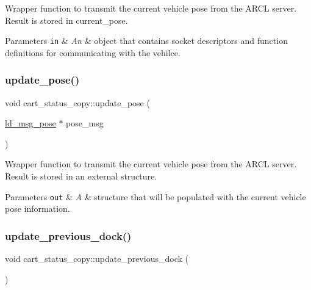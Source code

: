 Wrapper function to transmit the current vehicle pose from the A\+R\+CL server. Result is stored in current\+\_\+pose. 
\begin{DoxyParams}[1]{Parameters}
\mbox{\tt in}  & {\em An} & object that contains socket descriptors and function definitions for communicating with the vehilce. \\
\hline
\end{DoxyParams}
\mbox{\label{classcart__status__copy_ac688410b9b4a237d6ce6379e10f3c8bb}} 
\subsubsection{\texorpdfstring{update\+\_\+pose()}{update\_pose()}\hspace{0.1cm}{\footnotesize\ttfamily [2/2]}}
{\footnotesize\ttfamily void cart\+\_\+status\+\_\+copy\+::update\+\_\+pose (\begin{DoxyParamCaption}\item[{\hyperlink{structld__msg__pose}{ld\+\_\+msg\+\_\+pose} $\ast$}]{pose\+\_\+msg }\end{DoxyParamCaption})}

Wrapper function to transmit the current vehicle pose from the A\+R\+CL server. Result is stored in an external structure. 
\begin{DoxyParams}[1]{Parameters}
\mbox{\tt out}  & {\em A} & structure that will be populated with the current vehicle pose information. \\
\hline
\end{DoxyParams}
\mbox{\label{classcart__status__copy_a49621a3d5ab294434c04b17668c2d613}} 
\subsubsection{\texorpdfstring{update\+\_\+previous\+\_\+dock()}{update\_previous\_dock()}}
{\footnotesize\ttfamily void cart\+\_\+status\+\_\+copy\+::update\+\_\+previous\+\_\+dock (\begin{DoxyParamCaption}{ }\end{DoxyParamCaption})}

